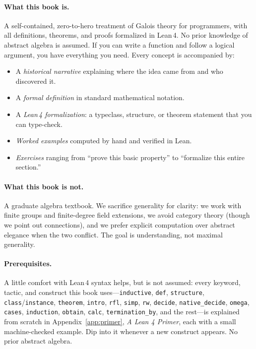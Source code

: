 \documentclass[11pt, a4paper, oneside]{book}
\newcommand{\lc}[1]{\texttt{#1}}
\begin{document}
\paragraph{What this book is.}
A self-contained, zero-to-hero treatment of Galois theory for programmers, with
all definitions, theorems, and proofs formalized in Lean\,4. No prior knowledge
of abstract algebra is assumed. If you can write a function and follow a logical
argument, you have everything you need. Every concept is accompanied by:
\begin{itemize}[nosep]
\item A \emph{historical narrative} explaining where the idea came from and who
      discovered it.
\item A \emph{formal definition} in standard mathematical notation.
\item A \emph{Lean\,4 formalization}: a typeclass, structure, or theorem
      statement that you can type-check.
\item \emph{Worked examples} computed by hand and verified in Lean.
\item \emph{Exercises} ranging from ``prove this basic property'' to
      ``formalize this entire section.''
\end{itemize}

\paragraph{What this book is not.}
A graduate algebra textbook. We sacrifice generality for clarity: we work with
finite groups and finite-degree field extensions, we avoid category theory
(though we point out connections), and we prefer explicit computation over
abstract elegance when the two conflict. The goal is understanding, not
maximal generality.

\paragraph{Prerequisites.}
A little comfort with Lean\,4 syntax helps, but is not assumed: every keyword,
tactic, and construct this book uses---\lc{inductive}, \lc{def}, \lc{structure},
\lc{class}/\lc{instance}, \lc{theorem}, \lc{intro}, \lc{rfl}, \lc{simp},
\lc{rw}, \lc{decide}, \lc{native\_decide}, \lc{omega}, \lc{cases},
\lc{induction}, \lc{obtain}, \lc{calc}, \lc{termination\_by}, and the rest---is
explained from scratch in Appendix~\ref{app:primer}, \emph{A Lean 4 Primer},
each with a small machine-checked example. Dip into it whenever a new construct
appears. No prior abstract algebra.
\end{document}
